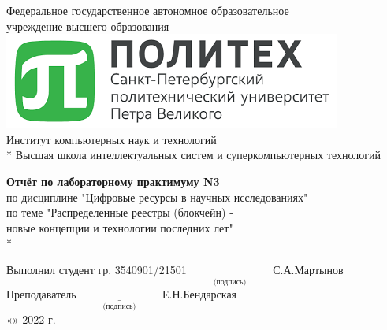 \begin{titlepage}

\begin{center} %
Федеральное государственное автономное образовательное \\
учреждение высшего образования \\[0.4cm]
\includegraphics[scale=0.8]{res/SPbPU-logo} \\[0.4cm]
Институт компьютерных наук и технологий \\*
Высшая школа интеллектуальных систем и суперкомпьютерных технологий
\end{center}

\vspace{3cm}

\begin{center} %
\textbf{Отчёт по лабораторному практимуму N3}\\
по дисциплине "Цифровые ресурсы в научных исследованиях" \\
по теме "Распределенные реестры (блокчейн) - \\ новые концепции и технологии последних лет" \\*
\end{center}

\vspace{3cm}
 
\begin{flushleft}
Выполнил студент гр. 3540901/21501 \hspace{3cm} $\underset{\text{(подпись)}}{\underline{\hspace{3cm}}}$ С.А.Мартынов\\[0.5cm]
Преподаватель \hspace{7.25cm} $\underset{\text{(подпись)}}{\underline{\hspace{3cm}}}$ Е.Н.Бендарская\\[0.5cm]
\hspace{10.2cm} «\underline{\hspace{1cm}}» \underline{\hspace{3cm}} 2022 г.
\end{flushleft}


\end{titlepage}
